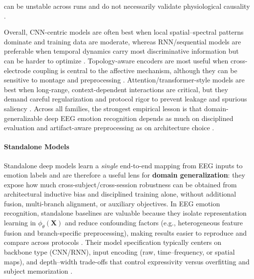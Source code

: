 \documentclass{WileyMSP-template}
\begin{document}
can be unstable across runs and do not necessarily validate physiological causality \cite{ctanfs2018asurveyo}.

Overall, CNN-centric models are often best when local spatial--spectral patterns dominate and training data are moderate, whereas RNN/sequential models are preferable when temporal dynamics carry most discriminative information but can be harder to optimize \cite{jcheng2021emotionr,sliuxw2020subjecti}. Topology-aware encoders are most useful when cross-electrode coupling is central to the affective mechanism, although they can be sensitive to montage and preprocessing \cite{tzhang2019spatialt}. Attention/transformer-style models are best when long-range, context-dependent interactions are critical, but they demand careful regularization and protocol rigor to prevent leakage and spurious saliency \cite{hheand2019channela,nssuha2020eegbased,yroyhb2019deeplear}. Across all families, the strongest empirical lesson is that domain-generalizable deep EEG emotion recognition depends as much on disciplined evaluation and artifact-aware preprocessing as on architecture choice \cite{cqlaih2018artifact,sphadi2021automati,megger2019emotionr}.

\paragraph{Standalone Models}
\label{sec:standalone_models}

Standalone deep models learn a \emph{single} end-to-end mapping from EEG inputs to emotion labels and are therefore a useful lens for \textbf{domain generalization}: they expose how much cross-subject/cross-session robustness can be obtained from architectural inductive bias and disciplined training alone, without additional fusion, multi-branch alignment, or auxiliary objectives. In EEG emotion recognition, standalone baselines are valuable because they isolate representation learning in $\phi_{\theta}(\mathbf{X})$ and reduce confounding factors (e.g., heterogeneous feature fusion and branch-specific preprocessing), making results easier to reproduce and compare across protocols \cite{saydn2020deeplear,megger2019emotionr}. Their model specification typically centers on backbone type (CNN/RNN), input encoding (raw, time--frequency, or spatial maps), and depth--width trade-offs that control expressivity versus overfitting and subject memorization \cite{jcheng2021emotionr}.
\end{document}
